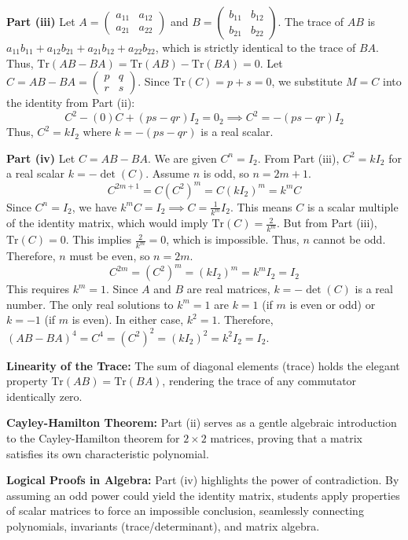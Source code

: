 \begin{solution}
\textbf{Part (iii)}
Let $A = \begin{pmatrix} a_{11} & a_{12} \\ a_{21} & a_{22} \end{pmatrix}$ and $B = \begin{pmatrix} b_{11} & b_{12} \\ b_{21} & b_{22} \end{pmatrix}$. 
The trace of $AB$ is $a_{11}b_{11} + a_{12}b_{21} + a_{21}b_{12} + a_{22}b_{22}$, which is strictly identical to the trace of $BA$. Thus, $\text{Tr}(AB - BA) = \text{Tr}(AB) - \text{Tr}(BA) = 0$.
Let $C = AB - BA = \begin{pmatrix} p & q \\ r & s \end{pmatrix}$. Since $\text{Tr}(C) = p+s = 0$, we substitute $M = C$ into the identity from Part (ii):
$$C^2 - (0)C + (ps-qr)I_2 = 0_2 \implies C^2 = -(ps-qr)I_2$$
Thus, $C^2 = kI_2$ where $k = -(ps-qr)$ is a real scalar.

\textbf{Part (iv)}
Let $C = AB - BA$. We are given $C^n = I_2$. From Part (iii), $C^2 = kI_2$ for a real scalar $k = -\det(C)$.
Assume $n$ is odd, so $n = 2m+1$. 
$$C^{2m+1} = C(C^2)^m = C(kI_2)^m = k^m C$$
Since $C^n = I_2$, we have $k^m C = I_2 \implies C = \frac{1}{k^m}I_2$. This means $C$ is a scalar multiple of the identity matrix, which would imply $\text{Tr}(C) = \frac{2}{k^m}$. But from Part (iii), $\text{Tr}(C) = 0$. This implies $\frac{2}{k^m} = 0$, which is impossible. Thus, $n$ cannot be odd.
Therefore, $n$ must be even, so $n = 2m$. 
$$C^{2m} = (C^2)^m = (kI_2)^m = k^m I_2 = I_2$$
This requires $k^m = 1$. Since $A$ and $B$ are real matrices, $k = -\det(C)$ is a real number. The only real solutions to $k^m = 1$ are $k = 1$ (if $m$ is even or odd) or $k = -1$ (if $m$ is even).
In either case, $k^2 = 1$. 
Therefore, $(AB - BA)^4 = C^4 = (C^2)^2 = (kI_2)^2 = k^2 I_2 = I_2$.
\end{solution}

\begin{takeaways}
    \item \textbf{Linearity of the Trace:} The sum of diagonal elements (trace) holds the elegant property $\text{Tr}(AB) = \text{Tr}(BA)$, rendering the trace of any commutator identically zero.
    \item \textbf{Cayley-Hamilton Theorem:} Part (ii) serves as a gentle algebraic introduction to the Cayley-Hamilton theorem for $2 \times 2$ matrices, proving that a matrix satisfies its own characteristic polynomial.
    \item \textbf{Logical Proofs in Algebra:} Part (iv) highlights the power of contradiction. By assuming an odd power could yield the identity matrix, students apply properties of scalar matrices to force an impossible conclusion, seamlessly connecting polynomials, invariants (trace/determinant), and matrix algebra.
\end{takeaways}

